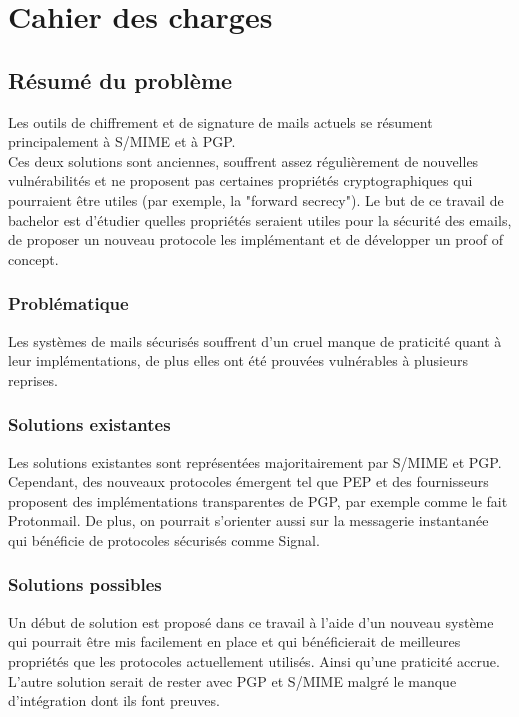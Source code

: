 \chapter{Cahier des charges}
\label{ch:cdc}
\section*{Résumé du problème}
Les outils de chiffrement et de signature de mails actuels se résument principalement à S/MIME et à PGP.\\
Ces deux solutions sont anciennes, souffrent assez régulièrement de nouvelles vulnérabilités et ne proposent pas certaines propriétés cryptographiques qui pourraient être utiles (par exemple, la "forward secrecy"). Le but de ce travail de bachelor est d'étudier quelles propriétés seraient utiles pour la sécurité des emails, de proposer un nouveau protocole les implémentant et de développer un proof of concept. 
\subsection*{Problématique}
Les systèmes de mails sécurisés souffrent d'un cruel manque de praticité quant à leur implémentations, de plus elles ont été prouvées vulnérables à plusieurs reprises.
\subsection*{Solutions existantes}
Les solutions existantes sont représentées majoritairement par S/MIME et PGP. Cependant, des nouveaux protocoles émergent tel que PEP et des fournisseurs proposent des implémentations transparentes de PGP, par exemple comme le fait Protonmail. De plus, on pourrait s'orienter aussi sur la messagerie instantanée qui bénéficie de protocoles sécurisés comme Signal.
\subsection*{Solutions possibles}
Un début de solution est proposé dans ce travail à l'aide d'un nouveau système qui pourrait être mis facilement en place et qui bénéficierait de meilleures propriétés que les protocoles actuellement utilisés. Ainsi qu'une praticité accrue. L'autre solution serait de rester avec PGP et S/MIME malgré le manque d'intégration dont ils font preuves.
